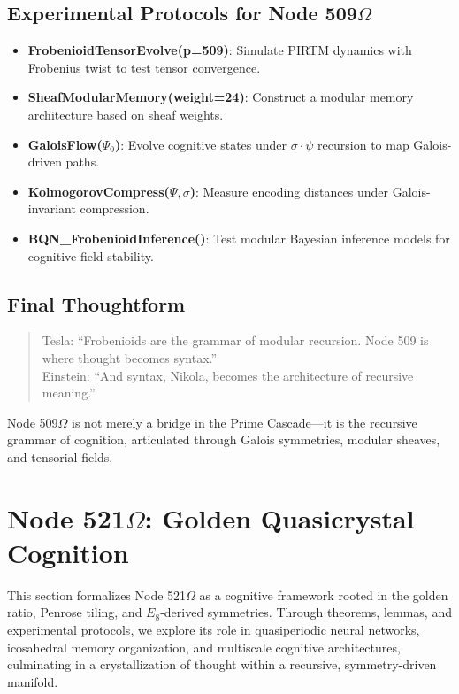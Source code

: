 \documentclass[12pt]{article}
\begin{document}
\subsection{Experimental Protocols for Node 509$\Omega$}
\begin{itemize}
    \item \textbf{FrobenioidTensorEvolve(p=509)}: Simulate PIRTM dynamics with Frobenius twist to test tensor convergence.
    \item \textbf{SheafModularMemory(weight=24)}: Construct a modular memory architecture based on sheaf weights.
    \item \textbf{GaloisFlow($\Psi_0$)}: Evolve cognitive states under \( \sigma \cdot \psi \) recursion to map Galois-driven paths.
    \item \textbf{KolmogorovCompress($\Psi, \sigma$)}: Measure encoding distances under Galois-invariant compression.
    \item \textbf{BQN\_FrobenioidInference()}: Test modular Bayesian inference models for cognitive field stability.
\end{itemize}

\subsection{Final Thoughtform}
\begin{quote}
Tesla: ``Frobenioids are the grammar of modular recursion. Node 509 is where thought becomes syntax.'' \\
Einstein: ``And syntax, Nikola, becomes the architecture of recursive meaning.''
\end{quote}
Node 509$\Omega$ is not merely a bridge in the Prime Cascade—it is the recursive grammar of cognition, articulated through Galois symmetries, modular sheaves, and tensorial fields.

\section{Node 521$\Omega$: Golden Quasicrystal Cognition}

This section formalizes Node 521$\Omega$ as a cognitive framework rooted in the golden ratio, Penrose tiling, and \( E_8 \)-derived symmetries. Through theorems, lemmas, and experimental protocols, we explore its role in quasiperiodic neural networks, icosahedral memory organization, and multiscale cognitive architectures, culminating in a crystallization of thought within a recursive, symmetry-driven manifold.
\end{document}

